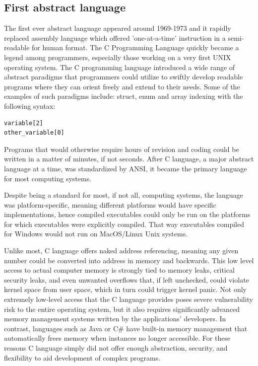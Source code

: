 \documentclass{article}
\begin{document}
\subsection{First abstract language}
The first ever abstract language appeared around 1969-1973 and it rapidly replaced assembly language which offered 'one-at-a-time' instruction in a semi-readable for human format. The C Programming Language quickly became a legend among programmers, especially those working on a very first UNIX operating system\cite{ritche_clang}.
The C programming language introduced a wide range of abstract paradigms that programmers could utilize to swiftly develop readable programs where they can orient freely and extend to their needs. Some of the examples of such paradigms include: struct, enum and array indexing with the following syntax:

\begin{lstlisting}[caption=C array indexing]
variable[2]
other_variable[0]
\end{lstlisting}

Programs that would otherwise require hours of revision and coding could be written in a matter of minutes, if not seconds. After C language, a major abstract language at a time, was standardized by ANSI, it became the primary language for most computing systems.

Despite being a standard for most, if not all, computing systems, the language was platform-specific, meaning different platforms would have specific implementations, hence compiled executables could only be run on the platforms for which executables were explicitly compiled. That way executables compiled for Windows would not run on MacOS/Linux Unix systems.

Unlike most, C language offers naked address referencing, meaning any given number could be converted into address in memory and backwards. This low level access to actual computer memory is strongly tied to memory leaks, critical security leaks, and even unwanted overflows that, if left unchecked, could violate kernel space from user space, which in turn could trigger kernel panic.\cite{6234805} Not only extremely low-level access that the C language provides poses severe vulnerability risk to the entire operating system, but it also requires significantly advanced memory management systems written by the applications' developers. In contrast, languages such as Java or C\# have built-in memory management that automatically frees memory when instances no longer accessible.
For these reasons C language simply did not offer enough abstraction, security, and flexibility to aid development of complex programs.\cite{schmidt_1977_some}
\end{document}
